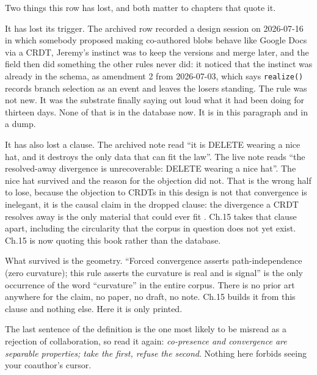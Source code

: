 Two things this row has lost, and both matter to chapters that quote it.

It has lost its trigger. The archived row recorded a design session on 2026-07-16 in which somebody proposed making co-authored blobs behave like Google Docs via a CRDT, Jeremy's instinct was to keep the versions and merge later, and the field then did something the other rules never did: it noticed that the instinct was already in the schema, as amendment 2 from 2026-07-03, which says \texttt{realize()} records branch selection as an event and leaves the losers standing. The rule was not new. It was the substrate finally saying out loud what it had been doing for thirteen days. None of that is in the database now. It is in this paragraph and in a dump.

It has also lost a clause. The archived note read ``it is DELETE wearing a nice hat, and it destroys the only data that can fit the law''. The live note reads ``the resolved-away divergence is unrecoverable: DELETE wearing a nice hat''. The nice hat survived and the reason for the objection did not. That is the wrong half to lose, because the objection to CRDTs in this design is not that convergence is inelegant, it is the causal claim in the dropped clause: the divergence a CRDT resolves away is the only material that could ever fit . Ch.15 takes that clause apart, including the circularity that the corpus in question does not yet exist. Ch.15 is now quoting this book rather than the database.

What survived is the geometry. ``Forced convergence asserts path-independence (zero curvature); this rule asserts the curvature is real and is signal'' is the only occurrence of the word ``curvature'' in the entire corpus. There is no prior art anywhere for the claim, no paper, no draft, no note. Ch.15 builds it from this clause and nothing else. Here it is only printed.

The last sentence of the definition is the one most likely to be misread as a rejection of collaboration, so read it again: \emph{co-presence and convergence are separable properties; take the first, refuse the second}. Nothing here forbids seeing your coauthor's cursor.

